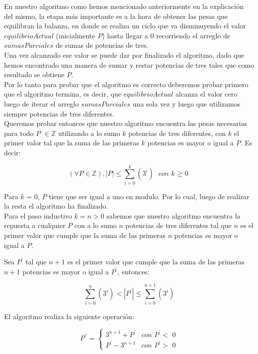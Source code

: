 En nuestro algoritmo como hemos mencionado anteriormente en la explicaci\'on del mismo, la etapa m\'as importante es a la hora de obtener las pesas que equilibran la balanza, en donde se realiza un ciclo que va disminuyendo el valor $equilibrioActual$ (inicialmente $P$) hasta llegar a 0 recorriendo el arreglo de $sumasParciales$ de sumas de potencias de tres.\\
Una vez alcanzado ese valor se puede dar por finalizado el algoritmo, dado que hemos encontrado una manera de sumar y restar potencias de tres tales que como resultado se obtiene $P$.\\

Por lo tanto para probar que el algoritmo es correcto deberemos probar primero que el algoritmo termina, es decir, que $equilibrioActual$ alcanza el valor cero luego de iterar el arreglo $sumasParciales$ una sola vez y luego que utilizamos siempre potencias de tres diferentes.\\

Queremos probar entonces que nuestro algoritmo encuentra las pesas necesarias para todo $P$ $ \in \mathbb{Z}$ utilizando a lo sumo $k$ potencias de tres diferentes, con $k$ el primer valor tal que la suma de las primeras $k$ potencias es mayor o igual a $P$. Es decir:

\begin{equation}
(\forall P \in \mathbb{Z}), |P| \leq \sum_{i=0}^{k}(3^i) \textit{ con k $\geq$ 0}
\end{equation}

Para $k$ = 0, $P$ tiene que ser igual a uno en modulo. Por lo cual, luego de realizar la resta el algoritmo ha finalizado.\\

Para el paso inductivo $k = n > 0$ sabemos que nuestro algoritmo encuentra la repuesta a cualquier $P$ con a lo sumo $n$ potencias de tres diferentes tal que $n$ es el primer valor que cumple que la suma de las primeras $n$ potencias es mayor o igual a $P$.

Sea $P^{'}$ tal que $n+1$ es el primer valor que cumple que la suma de las primeras $n+1$ potencias es mayor o igual a $P^{'}$, entonces:

\begin{equation}
\sum_{i=0}^{n}(3^i) <  |P^{'}| \leq \sum_{i=0}^{n+1}(3^i) 
\end{equation}

El algoritmo realiza la siguiente operación:

\begin{equation}
P^{''} = \left\{ \begin{array}{lcc}
             3^{n+1} + P^{'} & \textit{con $P^{'} <$ 0} \\
              P^{'} - 3^{n+1} & \textit{con $P^{'} >$ 0} 
             \end{array}
             \right.
\end{equation} 

